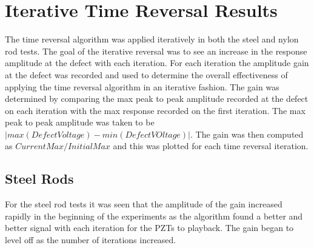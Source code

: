  \section{Iterative Time Reversal Results}
 The time reversal algorithm was applied iteratively in both the steel and nylon rod tests. The goal of the iterative reversal was to see an increase in the response amplitude at the defect with each iteration. For each iteration the amplitude gain at the defect was recorded and used to determine the overall effectiveness of applying the time  reversal algorithm in an iterative fashion. The gain was determined by comparing the max peak to peak amplitude recorded at the defect on each iteration with the max response recorded on the first iteration. The max peak to peak amplitude was taken to be $|max(DefectVoltage) - min(DefectVOltage)|$. The gain was then computed as $CurrentMax / InitialMax$ and this was plotted for each time reversal iteration. 
 
 \subsection{Steel Rods}
 For the steel rod tests it was seen that the amplitude of the gain increased rapidly in the beginning of the experiments as the algorithm found a better and better signal with each iteration for the PZTs to playback. The gain began to level off as the number of iterations increased.
 